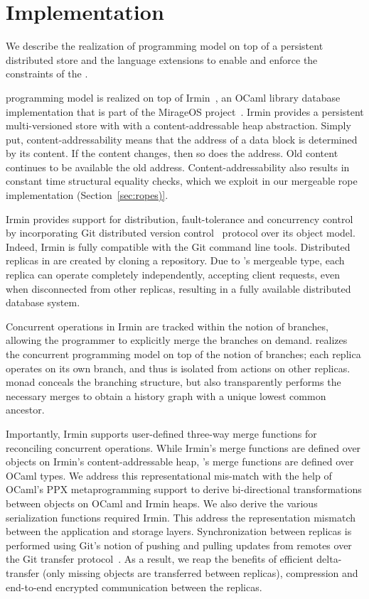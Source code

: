 \section{Implementation}
\label{sec:implementation}

We describe the realization of \name programming model on top of a persistent
distributed store and the language extensions to enable and enforce the
constraints of the \name.

\name programming model is realized on top of Irmin~\cite{irmin}, an OCaml
library database implementation that is part of the MirageOS
project~\cite{mirage}. Irmin provides a persistent multi-versioned store with
with a content-addressable heap abstraction. Simply put, content-addressability
means that the address of a data block is determined by its content. If the
content changes, then so does the address. Old content continues to be
available the old address. Content-addressability also results in constant time
structural equality checks, which we exploit in our mergeable rope
implementation (Section~\ref{sec:ropes)}.

Irmin provides support for distribution, fault-tolerance and concurrency
control by incorporating Git distributed version control~\cite{git} protocol
over its object model. Indeed, Irmin is fully compatible with the Git command
line tools. Distributed replicas in \name are created by cloning a \name
repository. Due to \name's mergeable type, each replica can operate completely
independently, accepting client requests, even when disconnected from other
replicas, resulting in a fully available distributed database system.

Concurrent operations in Irmin are tracked within the notion of branches,
allowing the programmer to explicitly merge the branches on demand. \name
realizes the concurrent programming model on top of the notion of branches;
each replica operates on its own branch, and thus is isolated from actions on
other replicas. \name monad conceals the branching structure, but also
transparently performs the necessary merges to obtain a history graph with a
unique lowest common ancestor.

Importantly, Irmin supports user-defined three-way merge functions for
reconciling concurrent operations. While Irmin's merge functions are defined
over objects on Irmin's content-addressable heap, \name's merge functions are
defined over OCaml types. We address this representational mis-match with the
help of OCaml's PPX metaprogramming support to derive bi-directional
transformations between objects on OCaml and Irmin heaps. We also derive the
various serialization functions required Irmin. This address the representation
mismatch between the application and storage layers. Synchronization between
replicas is performed using Git's notion of pushing and pulling updates from
remotes over the Git transfer protocol~\cite{git-tp}. As a result, we reap the
benefits of efficient delta-transfer (only missing objects are transferred
between replicas), compression and end-to-end encrypted communication between
the replicas.
